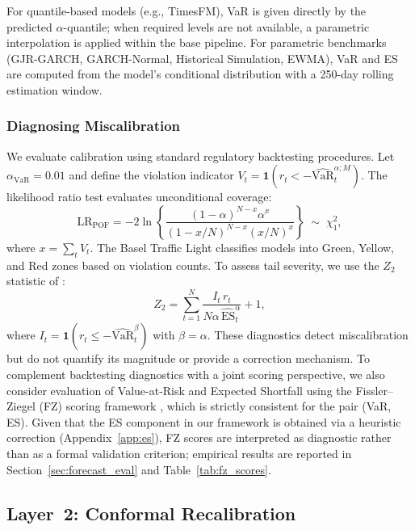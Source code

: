 \documentclass[preprint,11pt,authoryear]{elsarticle}
\newcommand{\VaR}{\mathrm{VaR}}
\newcommand{\ES}{\mathrm{ES}}
\newcommand{\1}{\boldsymbol{1}}
\begin{document}
	For quantile-based models (e.g., TimesFM), VaR is given
	directly by the predicted $\alpha$-quantile; when required
	levels are not available, a parametric interpolation is applied
	within the base pipeline. For parametric benchmarks
	(GJR-GARCH, GARCH-Normal, Historical Simulation, EWMA), VaR
	and ES are computed from the model's conditional distribution
	with a 250-day rolling estimation window.
	
	\subsubsection{Diagnosing Miscalibration}
	\label{sec:diag}
	
	We evaluate calibration using standard regulatory backtesting
	procedures. Let $\alpha_{\mathrm{VaR}} = 0.01$ and define the
	violation indicator
	$V_t = \1(r_t < -\widehat{\VaR}_t^{\alpha;M})$. The
	\citet{kupiec1995} likelihood ratio test evaluates
	unconditional coverage:
	\begin{equation}
		\label{eq:kupiec}
		\mathrm{LR}_{\mathrm{POF}} = -2\ln\!\left\{
		\frac{(1-\alpha)^{N-x}\alpha^x}
		{(1-x/N)^{N-x}(x/N)^x}\right\}
		\;\sim\; \chi^2_1,
	\end{equation}
	where $x = \sum_t V_t$. The Basel Traffic Light
	\citep{basel1996} classifies models into Green, Yellow, and
	Red zones based on violation counts. To assess tail severity,
	we use the $Z_2$ statistic of \citet{acerbi2014back}:
	\begin{equation}
		\label{eq:Z2}
		Z_2 = \sum_{t=1}^N
		\frac{I_t\, r_t}{N\alpha\,\widehat{\ES}_t^\alpha} + 1,
	\end{equation}
	where $I_t = \1(r_t \leq -\widehat{\VaR}_t^\beta)$ with $\beta = \alpha$. These
	diagnostics detect miscalibration but do not quantify its
	magnitude or provide a correction mechanism.
	To complement backtesting diagnostics with a joint scoring perspective, we also consider evaluation of Value-at-Risk and Expected Shortfall using the Fissler--Ziegel (FZ) scoring framework \citep{fissler2016higher}, which is strictly consistent for the pair (VaR, ES). Given that the ES component in our framework is obtained via a heuristic correction (Appendix~\ref{app:es}), FZ scores are interpreted as diagnostic rather than as a formal validation criterion; empirical results are reported in Section~\ref{sec:forecast_eval} and Table~\ref{tab:fz_scores}.

	\subsection{Layer~2: Conformal Recalibration}
	\label{sec:layer2}
	
\end{document}
